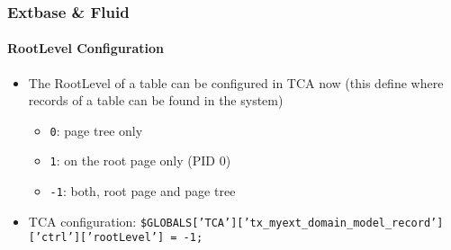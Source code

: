 \begin{frame}[fragile]
	\frametitle{Extbase \& Fluid}
	\framesubtitle{RootLevel Configuration}

	\lstset{basicstyle=\small\ttfamily}

	\begin{itemize}

		\item The RootLevel of a table can be configured in TCA now\newline
			\small(this define where records of a table can be found in the system)\normalsize

			\begin{itemize}
				\item \texttt{0}: page tree only
				\item \texttt{1}: on the root page only (PID 0)
				\item \texttt{-1}: both, root page and page tree
			\end{itemize}

		\item TCA configuration:\newline
			\tiny
				\texttt{\$GLOBALS['TCA']['tx\_myext\_domain\_model\_record']['ctrl']['rootLevel'] = -1;}
			\normalsize

	\end{itemize}

\end{frame}

